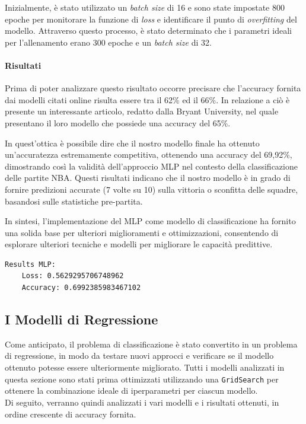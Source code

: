 Inizialmente, è stato utilizzato un \textit{batch size} di 16 e sono state impostate 800 epoche per monitorare la funzione di \textit{loss} e identificare il punto di \textit{overfitting} del modello. Attraverso questo processo, è stato determinato che i parametri ideali per l'allenamento erano 300 epoche e un \textit{batch size} di 32.

\paragraph{Risultati}
Prima di poter analizzare questo risultato occorre precisare che l'accuracy fornita dai modelli citati online risulta essere tra il 62\% ed il 66\%. In relazione a ciò è presente un interessante articolo, redatto dalla Bryant University, nel quale presentano il loro modello che possiede una accuracy del 65\%.

In quest'ottica è possibile dire che il nostro modello finale ha ottenuto un'accuratezza estremamente competitiva, ottenendo una accuracy del 69,92\%, dimostrando così la validità dell'approccio MLP nel contesto della classificazione delle partite NBA. Questi risultati indicano che il nostro modello è in grado di fornire predizioni accurate (7 volte su 10) sulla vittoria o sconfitta delle squadre, basandosi sulle statistiche pre-partita.

In sintesi, l'implementazione del MLP come modello di classificazione ha fornito una solida base per ulteriori miglioramenti e ottimizzazioni, consentendo di esplorare ulteriori tecniche e modelli per migliorare le capacità predittive.
\begin{lstlisting}
Results MLP:
    Loss: 0.5629295706748962
    Accuracy: 0.6992385983467102
\end{lstlisting}


\subsection{I Modelli di Regressione}
Come anticipato, il problema di classificazione è stato convertito in un problema di regressione, in modo da testare nuovi approcci e verificare se il modello ottenuto potesse essere ulteriormente migliorato.
Tutti i modelli analizzati in questa sezione sono stati prima ottimizzati utilizzando una \texttt{GridSearch} per ottenere la combinazione ideale di iperparametri per ciascun modello.\\
Di seguito, verranno quindi analizzati i vari modelli e i risultati ottenuti, in ordine crescente di accuracy fornita.


